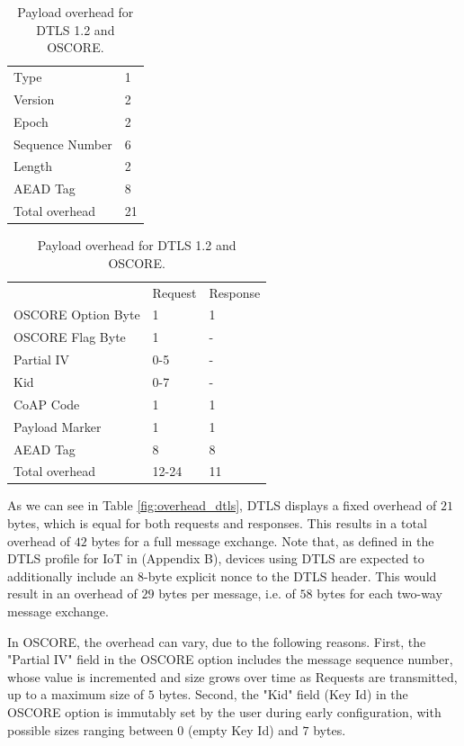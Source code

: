 {\begin{table}[ht]
\captionsetup[subtable]{position = below}
\captionsetup[table]{position=top}
\begin{subtable}{0.3\linewidth}
\centering
\begin{tabular}{l|l}
Type    & 1  \\
Version & 2  \\
Epoch           & 2  \\
Sequence Number & 6  \\
Length          & 2  \\
AEAD Tag        & 8  \\ \hline
Total overhead           & 21
\end{tabular}
\caption{Overhead of a DTLS-record layer message (bytes).}
\label{fig:overhead_dtls}
\end{subtable}%
\hspace*{2em}
\begin{subtable}{0.3\linewidth}
\centering
\begin{tabular}{l|l|l}
                     & Request & Response \\
OSCORE Option Byte   & 1    & 1\\
OSCORE Flag Byte     & 1    & -\\
Partial IV           & 0-5  & -\\
Kid                  & 0-7  & -\\
CoAP Code            & 1    & 1\\
Payload Marker       & 1    & 1\\
AEAD Tag             & 8    &  8\\ \hline
Total overhead       & 12-24 & 11
\end{tabular}
\caption{Overhead of an OSCORE message (bytes).}
\label{fig:overhead_oscore}

\end{subtable}
\caption{Payload overhead for DTLS 1.2 and OSCORE.}
\end{table}

As we can see in Table \ref{fig:overhead_dtls}, DTLS displays a fixed overhead of $21$ bytes, which is equal for both requests and responses. This results in a total overhead of $42$ bytes for a full message exchange. Note that, as defined in the DTLS profile for IoT in \cite{rfc7925} (Appendix B), devices using DTLS are expected to additionally include an $8$-byte explicit nonce to the DTLS header. This would result in an overhead of $29$ bytes per message, i.e. of $58$ bytes for each two-way message exchange.

In OSCORE, the overhead can vary, due to the following reasons. First, the "Partial IV" field in the OSCORE option includes the message sequence number, whose value is incremented and size grows over time as Requests are transmitted, up to a maximum size of $5$ bytes. Second, the "Kid" field (Key Id) in the OSCORE option is immutably set by the user during early configuration, with possible sizes ranging between $0$ (empty Key Id) and $7$ bytes. 

}
